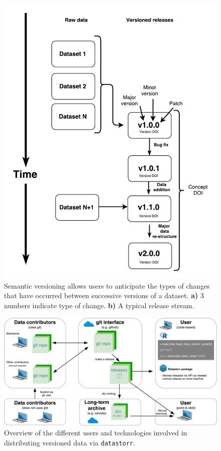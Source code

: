 \documentclass[a4paper,11pt]{article}
\begin{document}
\begin{figure}[!hb]
\centering
\includegraphics[width=\linewidth]{figures/Figure1.pdf}
\caption{Semantic versioning allows users to anticipate the types of changes that have occurred between successive versions of a dataset.
\textbf{a)} 3 numbers indicate type of change.
\textbf{b)} A typical release stream.}
\label{fig:semantic}
\end{figure}

\newpage


\begin{figure}[!hb]
\centering
\includegraphics[width=\linewidth]{figures/Figure2.pdf}
\caption{Overview of the different users and technologies involved in distributing versioned data via \texttt{datastorr}.}
\label{fig:technology_stack}
\end{figure}

\end{document}
